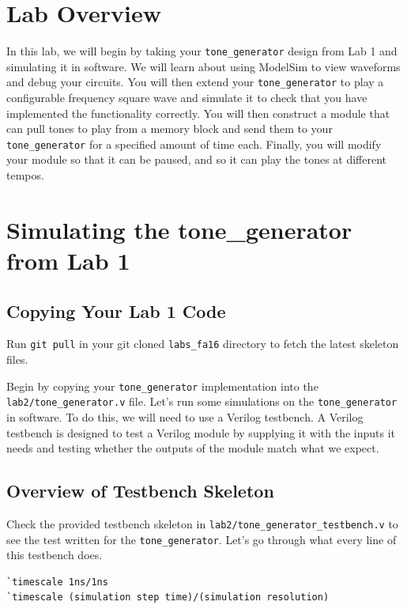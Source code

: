 \documentclass[11pt]{article}
\begin{document}
\section{Lab Overview}

In this lab, we will begin by taking your \verb|tone_generator| design from Lab 1 and simulating it in software. We will learn about using ModelSim to view waveforms and debug your circuits. You will then extend your \verb|tone_generator| to play a configurable frequency square wave and simulate it to check that you have implemented the functionality correctly. You will then construct a module that can pull tones to play from a memory block and send them to your \verb|tone_generator| for a specified amount of time each. Finally, you will modify your module so that it can be paused, and so it can play the tones at different tempos.

\section{Simulating the tone\_generator from Lab 1}

\subsection{Copying Your Lab 1 Code}

Run \verb|git pull| in your git cloned \verb|labs_fa16| directory to fetch the latest skeleton files.

Begin by copying your \verb|tone_generator| implementation into the \verb|lab2/tone_generator.v| file. Let's run some simulations on the \verb|tone_generator| in software. To do this, we will need to use a Verilog testbench. A Verilog testbench is designed to test a Verilog module by supplying it with the inputs it needs and testing whether the outputs of the module match what we expect.


\subsection{Overview of Testbench Skeleton}
Check the provided testbench skeleton in \verb|lab2/tone_generator_testbench.v| to see the test written for the \verb|tone_generator|. Let's go through what every line of this testbench does.

\begin{verbatim}
`timescale 1ns/1ns
`timescale (simulation step time)/(simulation resolution)
\end{verbatim}
\end{document}
